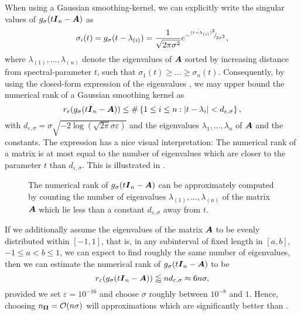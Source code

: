 \documentclass[12pt]{article}
\begin{document}
When using a Gaussian smoothing-kernel, we can explicitly write the singular values of $g_{\sigma}(t\boldsymbol{I}_n - \boldsymbol{A})$ as
\begin{equation}
    \sigma_i(t) = g_{\sigma}(t - \lambda_{(i)}) = \frac{1}{\sqrt{2 \pi \sigma^2}} e^{-{}^{(t - \lambda_{(i)})^2}{\mskip -5mu/\mskip -3mu}_{2 \sigma^2}},
    \label{equ:gaussian-kernel-eigenvalues}
\end{equation}
where $\lambda_{(1)}, \dots, \lambda_{(n)}$ denote the eigenvalues of $\boldsymbol{A}$ sorted by increasing distance from spectral-parameter $t$, such that $\sigma_1(t) \geq \dots \geq \sigma_n(t)$. Consequently, by using the closed-form expression of the eigenvalues , we may upper bound the numerical rank of a Gaussian smoothing kernel as
\begin{equation}
    r_{\varepsilon}(g_{\sigma}(t\boldsymbol{I}_n - \boldsymbol{A})) \leq \#\left\{1\leq i\leq n: |t - \lambda_i| < d_{\varepsilon, \sigma} \right\},
    \label{equ:gaussian-kernel-numerical-rank}
\end{equation}
with $d_{\varepsilon, \sigma} = \sigma \sqrt{-2 \log(\sqrt{2 \pi} \sigma \varepsilon)}$ and the eigenvalues $\lambda_1, \dots, \lambda_n$ of $\boldsymbol{A}$ and the constants. The expression  has a nice visual interpretation: The numerical rank of a matrix is at most equal to the number of eigenvalues which are closer to the parameter $t$ than $d_{\varepsilon, \sigma}$. This is illustrated in .
\begin{figure}[ht]
    \centering
    
    \caption{The numerical rank of $g_{\sigma}(t\boldsymbol{I}_n - \boldsymbol{A})$ can be
        approximately computed by counting the number of eigenvalues
        $\lambda_{(1)}, \dots, \lambda_{(n)}$ of the matrix $\boldsymbol{A}$ which lie less than
        a constant $d_{\varepsilon, \sigma}$ away from $t$.}
    \label{fig:numerical-rank}
\end{figure}

If we additionally assume the eigenvalues of the matrix $\boldsymbol{A}$ to be evenly distributed within $[-1, 1]$, that is, in any subinterval of fixed length in $[a, b]$, $-1 \leq a < b \leq 1$, we can expect to find roughly the same number of eigenvalues, then we can estimate the numerical rank of $g_{\sigma}(t\boldsymbol{I}_n - \boldsymbol{A})$ to be
\begin{equation}
    r_{\varepsilon}(g_{\sigma}(t\boldsymbol{I}_n - \boldsymbol{A})) \lessapprox n d_{\varepsilon, \sigma} \approx 6 n \sigma,
    \label{equ:gaussian-kernel-numerical-rank-uniform}
\end{equation}
provided we set $\varepsilon = 10^{-16}$ and choose $\sigma$ roughly between $10^{-8}$ and $1$. Hence, choosing $n_{\boldsymbol{\Omega}} = \mathcal{O}(n \sigma)$ will approximations which are significantly better than .
\end{document}
